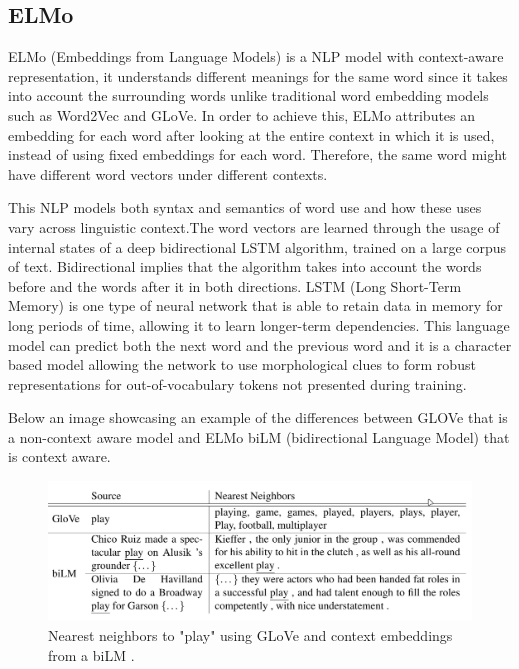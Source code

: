         \newpage


        \subsection{ELMo}

            \par ELMo (Embeddings from Language Models) is a NLP model with context-aware representation, it understands different meanings for the same word since it takes into account the surrounding words unlike traditional word embedding models such as Word2Vec and GLoVe. In order to achieve this, ELMo attributes an embedding for each word after looking at the entire context in which it is used, instead of using fixed embeddings for each word. Therefore, the same word might have different word vectors under different contexts.
            \par This NLP models both syntax and semantics of word use and how these uses vary across linguistic context.The word vectors are learned through the usage of internal states of a deep bidirectional LSTM algorithm, trained on a large corpus of text. Bidirectional implies that the algorithm takes into account the words before and the words after it in both directions. LSTM (Long Short-Term Memory) is one type of neural network that is able to retain data in memory for long periods of time, allowing it to learn longer-term dependencies.
            This language model can predict both the next word and the previous word and it is a character based model allowing the network to use morphological clues to form robust representations for out-of-vocabulary tokens not presented during training.  \cite{Peters:2018}
            \par Below an image showcasing an example of the differences between GLOVe that is a non-context aware model and ELMo biLM (bidirectional Language Model) that is context aware.

            
        \begin{figure}[htb]
            \centering
            \includegraphics[scale = 0.3]{Sections/3StateOfTheArt/3_images/ELMO.png}
            \caption{Nearest neighbors to "play" using GLoVe and context embeddings from a biLM \cite{Peters:2018}.} 
        \end{figure}

